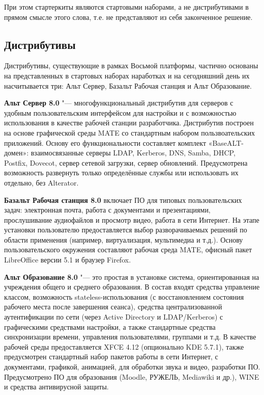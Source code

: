 \documentclass[10pt, a5paper]{article}
\begin{document}
При этом стартеркиты являются стартовыми наборами, а не  дистрибутивами в прямом смысле этого слова, т.е. не представляют из себя законченное решение.

\subsection*{Дистрибутивы}

Дистрибутивы, существующие в рамках Восьмой платформы, частично основаны на представленных в стартовых наборах наработках и на сегодняшний день их насчитывается три: Альт Сервер, Базальт Рабочая станция и Альт Образование.

\textbf{Альт Сервер 8.0} "--- многофункциональный дистрибутив для серверов с  удобным пользовательским интерфейсом для настройки и с возможностью использования в качестве рабочей станции разработчика. Дистрибутив построен на основе графической среды MATE со стандартным набором пользвоательских приложений. Основу его функциональности составляет комплект «BaseALT-домен»: взаимосвязанные серверы LDAP, Kerberos, DNS, Samba, DHCP, \linebreak Postfix, Dovecot, сервер сетевой загрузки, сервер обновлений. Предусмотрена возможность развернуть только определённые службы или использовать их отдельно, без Alterator.

\textbf{Базальт Рабочая станция 8.0} включает ПО для типовых пользовательских задач: электронная почта, работа с документами и презентациями, прослушивание аудиофайлов и просмотр видео, работа в сети Интернет. На этапе установки пользователю предоставляется выбор разворачиваемых решений по области применения (например, виртуализация, мультимедиа и т.д.). Основу пользовательского окружения составляют рабочая среда  MATE, офисный пакет LibreOffice версии 5.1 и браузер Firefox.

\textbf{Альт Образование 8.0} "--- это простая в установке система, ориентированная на учреждения общего и среднего образования. В состав входят средства управление классом, возможность stateless-использования (с восстановлением состояния рабочего места после завершения сеанса), средства централизованной аутентификации по сети (через Active Directory и LDAP/Kerberos) с графическими средствами настройки, а также стандартные средства синхронизации времени, управления пользователями, группами и т.д. В качестве рабочей среды предоставляется XFCE 4.12 (опционально KDE 5.7.1), также предусмотрен стандартный набор пакетов работы в сети Интернет, с документами, графикой, анимацией, для обработки звука и видео, разработки ПО. Предусмотрено ПО для образования (Moodle, РУЖЕЛЬ, Mediawiki и др.), WINE и средства антивирусной защиты.
\end{document}
